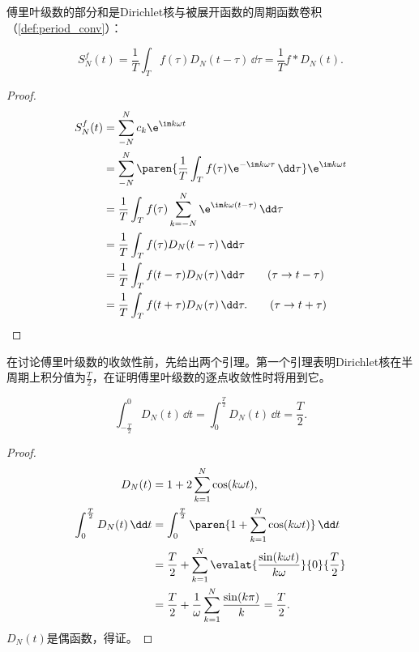 傅里叶级数的部分和是Dirichlet核与被展开函数的周期函数卷积（\cref{def:period_conv}）：
\begin{proposition}
    \begin{equation}
        S_N^f(t)=\frac{1}{T}\int_{T}f(\tau)D_N(t-\tau)\,\dd\tau=\frac{1}{T}f*D_N(t).
    \end{equation}
\end{proposition}
\begin{proof}
    \begin{align}
        S_N^f(t)&=\sum_{-N}^{N}c_k \e^{\im k\omega t} \nonumber \\
        &=\sum_{-N}^{N}\paren{\frac{1}{T}\int_{T}f(\tau)\e^{-\im k\omega \tau}\,\dd\tau}\e^{\im k\omega t} \nonumber \\
        &=\frac{1}{T}\int_{T}f(\tau)\sum_{k=-N}^{N}\e^{\im k\omega (t-\tau)}\,\dd\tau \nonumber \\
        &=\frac{1}{T}\int_{T}f(\tau)D_N(t-\tau)\,\dd\tau \nonumber \\
        &=\frac{1}{T}\int_{T}f(t-\tau)D_N(\tau)\,\dd\tau \qquad (\tau\to t-\tau) \nonumber \\
        &=\frac{1}{T}\int_{T}f(t+\tau)D_N(\tau)\,\dd\tau. \qquad (\tau\to t+\tau)
    \end{align}
\end{proof}

在讨论傅里叶级数的收敛性前，先给出两个引理。第一个引理表明Dirichlet核在半周期上积分值为$\displaystyle\frac{T}{2}$，在证明傅里叶级数的逐点收敛性时将用到它。
\begin{lemma}
    \begin{equation}
        \int_{-\frac{T}{2}}^{0}D_N(t)\,\dd t=\int_{0}^{\frac{T}{2}}D_N(t)\,\dd t=\frac{T}{2}.
    \end{equation}
\end{lemma}
\begin{proof}
    \begin{align}
        D_N(t)&=1+2\sum_{k=1}^{N}\cos(k\omega t), \\
        \int_{0}^{\frac{T}{2}}D_N(t)\,\dd t&=\int_{0}^{\frac{T}{2}}\paren{1+\sum_{k=1}^{N}\cos(k\omega t)}\,\dd t \nonumber \\
        &=\frac{T}{2}+\sum_{k=1}^{N}\evalat{\frac{\sin(k\omega t)}{k\omega}}{0}{\frac{T}{2}} \nonumber \\
        &=\frac{T}{2}+\frac{1}{\omega}\sum_{k=1}^{N}\frac{\sin(k\pi)}{k}=\frac{T}{2}.
    \end{align}
    $D_N(t)$是偶函数，得证。
\end{proof}

